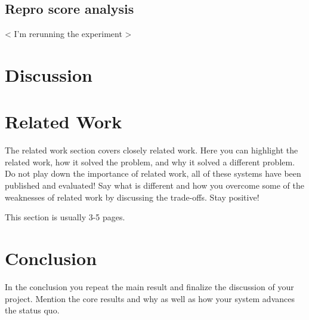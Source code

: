 \documentclass[a4paper,11pt,oneside]{report}
\theoremstyle{definition}
\begin{document}
\section{Repro score analysis}
< I'm rerunning the experiment >

\chapter{Discussion}
\label{chap:disc}


\chapter{Related Work}

The related work section covers closely related work. Here you can highlight
the related work, how it solved the problem, and why it solved a different
problem. Do not play down the importance of related work, all of these
systems have been published and evaluated! Say what is different and how
you overcome some of the weaknesses of related work by discussing the
trade-offs. Stay positive!

This section is usually 3-5 pages.


\chapter{Conclusion}

In the conclusion you repeat the main result and finalize the discussion of
your project. Mention the core results and why as well as how your system
advances the status quo.

\cleardoublepage
{}
{}
\printbibliography
\end{document}
